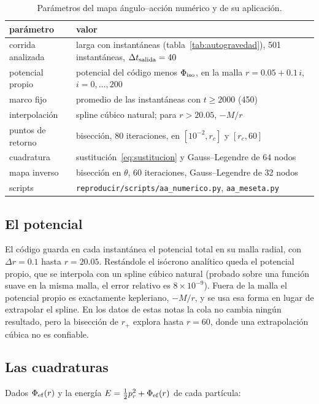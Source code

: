 \documentclass[11pt,a4paper]{article}
\newcommand{\rp}{p_r}
\theoremstyle{definition}
\begin{document}
\begin{table}[ht]
\centering
\small
\caption{Parámetros del mapa ángulo--acción numérico y de su aplicación.}
\label{tab:mapanumerico}
\begin{tabular}{ll}
\toprule
parámetro & valor \\
\midrule
corrida analizada & larga con instantáneas (tabla~\ref{tab:autogravedad}), 501 instantáneas, $\Delta t_{\rm salida}=40$ \\
potencial propio & potencial del código menos $\Phi_{\rm iso}$, en la malla $r=0.05+0.1\,i$, $i=0,\dots,200$ \\
marco fijo & promedio de las instantáneas con $t\ge2000$ (450) \\
interpolación & spline cúbico natural; para $r>20.05$, $-M/r$ \\
puntos de retorno & bisección, 80 iteraciones, en $[10^{-2},r_c]$ y $[r_c,60]$ \\
cuadratura & sustitución~\eqref{eq:sustitucion} y Gauss--Legendre de 64 nodos \\
mapa inverso & bisección en $\theta$, 60 iteraciones, Gauss--Legendre de 32 nodos \\
\midrule
scripts & \texttt{reproducir/scripts/aa\_numerico.py}, \texttt{aa\_meseta.py} \\
\bottomrule
\end{tabular}
\end{table}

\subsection{El potencial}

El código guarda en cada instantánea el potencial total en su malla radial, con
$\Delta r=0.1$ hasta $r=20.05$. Restándole el isócrono analítico queda el potencial
propio, que se interpola con un spline cúbico natural (probado sobre una función suave
en la misma malla, el error relativo es $8\times10^{-9}$). Fuera de la malla el
potencial propio es exactamente kepleriano, $-M/r$, y se usa esa forma en lugar de
extrapolar el spline. En los datos de estas notas la cola no cambia ningún
resultado, pero la bisección de $r_+$ explora hasta $r=60$, donde una extrapolación
cúbica no es confiable.

\subsection{Las cuadraturas}

Dados $\Phi_{\rm ef}(r)$ y la energía $E=\tfrac12\rp^2+\Phi_{\rm ef}(r)$ de cada
partícula:
\end{document}
